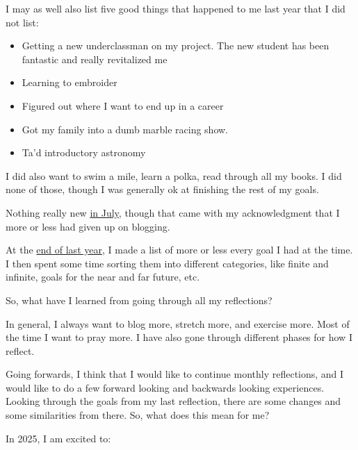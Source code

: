 \documentclass[12pt]{article}[titlepage]
\renewcommand{\,}{\textsuperscript{,}}
\begin{document}
I may as well also list five good things that happened to me last year that I did not list:

\begin{itemize}  
\item Getting a new underclassman on my project. The new student has been fantastic and really revitalized me  
\item Learning to embroider  
\item Figured out where I want to end up in a career  
\item Got my family into a dumb marble racing show.  
\item Ta'd introductory astronomy  
\end{itemize}

I did also want to swim a mile, learn a polka, read through all my books. I did none of those, though I was generally ok at finishing the rest of my goals.

Nothing really new \href{reflection-2024a}{in July}, though that came with my acknowledgment that I more or less had given up on blogging.

At the \href{reflection-2024b}{end of last year}, I made a list of more or less every goal I had at the time.  
I then spent some time sorting them into different categories, like finite and infinite, goals for the near and far future, etc.

So, what have I learned from going through all my reflections?

In general, I always want to blog more, stretch more, and exercise more.  
Most of the time I want to pray more.  
I have also gone through different phases for how I reflect.

Going forwards, I think that I would like to continue monthly reflections, and I would like to do a few forward looking and backwards looking experiences.  
Looking through the goals from my last reflection, there are some changes and some similarities from there.  
So, what does this mean for me?

In 2025, I am excited to:
\end{document}
